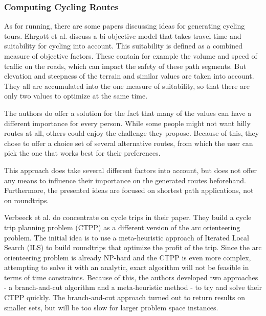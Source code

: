 \subsubsection{Computing Cycling Routes}
\label{subsubsec:cyclingRoutes}
As for running, there are some papers discussing ideas for generating cycling tours.
Ehrgott et al. discuss a bi-objective model that takes travel time and \glqq suitability for cycling\grqq{} into account.
This suitability is defined as a combined measure of objective factors. 
These contain for example the volume and speed of traffic on the roads, which can impact the safety of these path segments. 
But elevation and steepness of the terrain and similar values are taken into account.
They all are accumulated into the one measure of suitability, so that there are only two values to optimize at the same time. \cite{ehrgott_bi-objective_2012} 

The authors do offer a solution for the fact that many of the values can have a different importance for every person. 
While some people might not want hilly routes at all, others could enjoy the challenge they propose. 
Because of this, they chose to offer a choice set of several alternative routes, from which the user can pick the one that works best for their preferences. \cite{ehrgott_bi-objective_2012}

This approach does take several different factors into account, but does not offer any means to influence their importance on the generated routes beforehand.
Furthermore, the presented ideas are focused on shortest path applications, not on roundtrips.

Verbeeck et al. do concentrate on cycle trips in their paper. 
They build a \glqq cycle trip planning problem (CTPP)\grqq{} as a different version of the arc orienteering problem. 
The initial idea is to use a meta-heuristic approach of Iterated Local Search (ILS) to build roundtrips that optimize the profit of the trip.
Since the arc orienteering problem is already NP-hard and the CTPP is even more complex, attempting to solve it with an analytic, exact algorithm will not be feasible in terms of time constraints. 
Because of this, the authors developed two approaches - a branch-and-cut algorithm and a meta-heuristic method - to try and solve their CTPP quickly. 
The branch-and-cut approach turned out to return results on smaller sets, but will be too slow for larger problem space instances. \cite{verbeeck_extension_2014}

